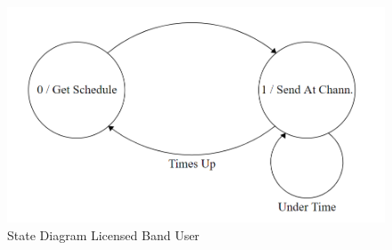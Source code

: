 \begin{figure}[ht]
\centering
\includegraphics[width=12cm]{figures/state_diagram_lbu.png}
\caption{State Diagram Licensed Band User}
\label{fig:state_diagram_lbu}
\end{figure}